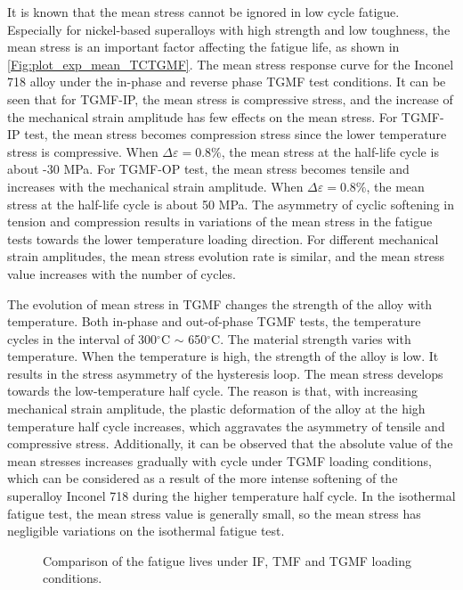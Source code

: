 \documentclass[preprint,5p,twocolumn,10pt,sort&compress]{elsarticle}
\begin{document}
It is known that the mean stress cannot be ignored in low cycle fatigue. Especially for nickel-based superalloys with high strength and low toughness, the mean stress is an important factor affecting the fatigue life, as shown in \autoref{Fig:plot_exp_mean_TCTGMF}. The mean stress response curve for the Inconel 718 alloy under the in-phase and reverse phase TGMF test conditions. It can be seen that for TGMF-IP, the mean stress is compressive stress, and the increase of the mechanical strain amplitude has few effects on the mean stress. For TGMF-IP test, the mean stress becomes compression stress since the lower temperature stress is compressive. When $\Delta \varepsilon=0.8\%$, the mean stress at the half-life cycle is about -30 MPa. For TGMF-OP test, the mean stress becomes tensile and increases with the mechanical strain amplitude.
When $\Delta \varepsilon=0.8\%$, the mean stress at the half-life cycle is about 50 MPa. The asymmetry of cyclic softening in tension and compression results in variations of the mean stress in the fatigue tests towards the lower temperature loading direction. For different mechanical strain amplitudes, the mean stress evolution rate is similar, and the mean stress value increases with the number of cycles.

The evolution of mean stress in TGMF changes  the strength of the alloy  with temperature. Both in-phase and out-of-phase TGMF tests, the temperature cycles in the interval of 300$^\circ$C $\sim$ 650$^\circ$C. The material strength varies with temperature. When the temperature is high, the strength of the alloy is low. It results in the stress asymmetry of the hysteresis loop. The mean stress develops towards the low-temperature half cycle.
The reason is that, with  increasing mechanical strain amplitude, the plastic deformation of the alloy at the high temperature half cycle increases, which aggravates the asymmetry of tensile and compressive stress.
Additionally, it can be observed that the absolute value of the mean stresses increases gradually with cycle under TGMF loading conditions, which can be considered as a result of the more intense softening of the superalloy Inconel 718 during the higher temperature half cycle. In the isothermal fatigue test, the mean stress value is generally small, so the mean stress has negligible variations on the isothermal fatigue test.

\begin{figure}[!ht]
\caption{Comparison of the fatigue lives under IF, TMF and TGMF loading conditions.}
\label{Fig:plot_exp_fatigue_life_TGMF}
\end{figure}
\end{document}
